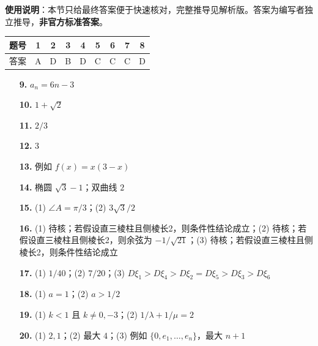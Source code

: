 
\begin{gknotice}
\textbf{使用说明}：本节只给最终答案便于快速核对，完整推导见解析版。答案为编写者独立推导，\textbf{非官方标准答案}。
\end{gknotice}

\begin{center}\begin{tabular}{ccccccccc}
\toprule
题号 & 1 & 2 & 3 & 4 & 5 & 6 & 7 & 8 \\
\midrule
答案 & A & D & B & D & C & C & C & D \\
\bottomrule
\end{tabular}\end{center}

\begin{itemize}[leftmargin=2.6em]
  \item[\textbf{9.}] $a_n=6n-3$
  \item[\textbf{10.}] $1+\sqrt2$
  \item[\textbf{11.}] $2/3$
  \item[\textbf{12.}] $3$
  \item[\textbf{13.}] 例如 $f(x)=x(3-x)$
  \item[\textbf{14.}] 椭圆 $\sqrt3-1$；双曲线 $2$
\end{itemize}

\begin{itemize}[leftmargin=2.6em]
  \item[\textbf{15.}] (1) $\angle A=\pi/3$；(2) $3\sqrt3/2$
  \item[\textbf{16.}] (1) 待核；若假设直三棱柱且侧棱长2，则条件性结论成立；(2) 待核；若假设直三棱柱且侧棱长2，则余弦为 $-1/\sqrt{21}$；(3) 待核；若假设直三棱柱且侧棱长2，则条件性结论成立
  \item[\textbf{17.}] (1) $1/40$；(2) $7/20$；(3) $D\xi_1>D\xi_4>D\xi_2=D\xi_5>D\xi_3>D\xi_6$
  \item[\textbf{18.}] (1) $a=1$；(2) $a>1/2$
  \item[\textbf{19.}] (1) $k<1$ 且 $k\ne0,-3$；(2) $1/\lambda+1/\mu=2$
  \item[\textbf{20.}] (1) $2,1$；(2) 最大 $4$；(3) 例如 $\{0,e_1,\ldots,e_n\}$，最大 $n+1$
\end{itemize}
